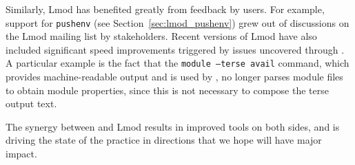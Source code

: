 Similarly, Lmod has benefited greatly from feedback by \easybuild{} users.
For example, support for \texttt{pushenv} (see
Section~\ref{sec:lmod_pushenv}) grew out of discussions on the Lmod
mailing list by \easybuild{} stakeholders. Recent versions of Lmod
have also included significant speed improvements triggered by issues
uncovered through \easybuild{}. A particular example is the fact that
the \texttt{module --terse avail} command, which provides machine-readable output and
is used by \easybuild{}, no longer parses module files to obtain module properties,
since this is not necessary to compose the terse output text.

The synergy between \easybuild{} and Lmod results in improved tools on both sides,
and is driving the state of the practice in directions that we hope will
have major impact.
